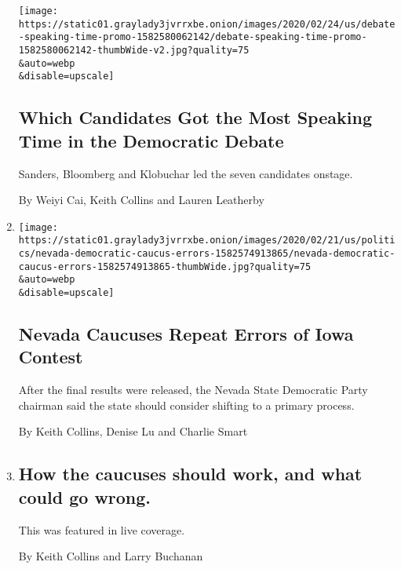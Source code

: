 \begin{enumerate}
  \texttt{[image: https://static01.graylady3jvrrxbe.onion/images/2020/02/24/us/debate-speaking-time-promo-1582580062142/debate-speaking-time-promo-1582580062142-thumbWide-v2.jpg?quality=75\\\&auto=webp\\\&disable=upscale]}

  \hypertarget{which-candidates-got-the-most-speaking-time-in-the-democratic-debate}{%
  \subsection{Which Candidates Got the Most Speaking Time in the
  Democratic
  Debate}\label{which-candidates-got-the-most-speaking-time-in-the-democratic-debate}}

  Sanders, Bloomberg and Klobuchar led the seven candidates onstage.

  By Weiyi Cai, Keith Collins and Lauren Leatherby
\item
  \href{/interactive/2020/02/24/us/politics/nevada-democratic-caucus-errors.html}{}

  \texttt{[image: https://static01.graylady3jvrrxbe.onion/images/2020/02/21/us/politics/nevada-democratic-caucus-errors-1582574913865/nevada-democratic-caucus-errors-1582574913865-thumbWide.jpg?quality=75\\\&auto=webp\\\&disable=upscale]}

  \hypertarget{nevada-caucuses-repeat-errors-of-iowa-contest}{%
  \subsection{Nevada Caucuses Repeat Errors of Iowa
  Contest}\label{nevada-caucuses-repeat-errors-of-iowa-contest}}

  After the final results were released, the Nevada State Democratic
  Party chairman said the state should consider shifting to a primary
  process.

  By Keith Collins, Denise Lu and Charlie Smart
\item
  \href{/live/2020/nevada-caucus-02-22/how-caucuses-work}{}

  \hypertarget{how-the-caucuses-should-work-and-what-could-go-wrong}{%
  \subsection{How the caucuses should work, and what could go
  wrong.}\label{how-the-caucuses-should-work-and-what-could-go-wrong}}

  This was featured in live coverage.

  By Keith Collins and Larry Buchanan
\end{enumerate}

